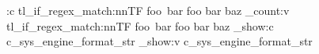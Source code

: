 \use:c
  { tl_if_regex_match:nnTF }  %
  { foo~bar }
  { foo }
  { bar }
  { baz }
\tl_count:v
  { tl_if_regex_match:nnTF }  %
  { foo~bar }
  { foo }
  { bar }
  { baz }
\str_show:c  %
  { c_sys_engine_format_str }
\str_show:v  %
  { c_sys_engine_format_str }
